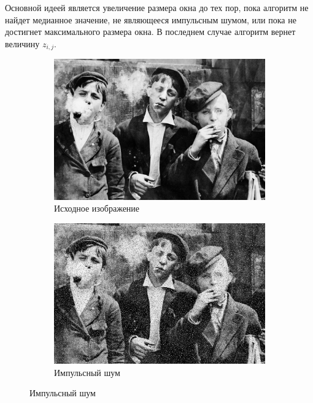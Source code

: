 Основной идеей является увеличение размера окна до тех пор,
пока алгоритм не найдет медианное значение, не являющееся импульсным шумом, или пока не достигнет максимального размера
окна. В последнем случае алгоритм вернет величину $z_{i,j}$.

\begin{figure}[ht!] 
  \centering
  \begin{subfigure}[b]{0.5\linewidth}
      \centering
      \includegraphics[width=0.95\linewidth]{../lewis-hine-taschen-main-3.jpg} 
      \caption{Исходное изображение} 
      \vspace{4ex}
  \end{subfigure}%
  \begin{subfigure}[b]{0.5\linewidth}
    \centering
    \includegraphics[width=0.95\linewidth]{../Adaptive_Median_Filter/Adaptive_Median_Impulse_noise_k=3.jpg} 
    \caption{Импульсный шум} 
    \vspace{4ex}
  \end{subfigure}

\end{figure}
